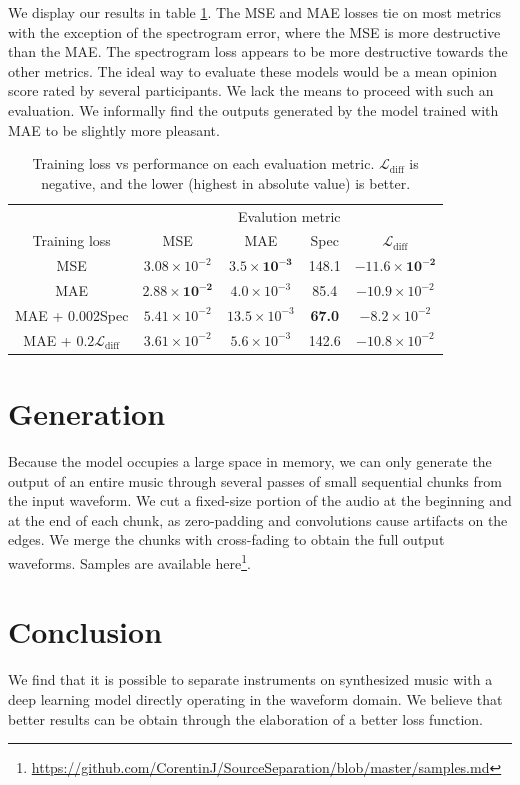 \documentclass[twocolumn,superscriptaddress,aps]{revtex4-1}
\begin{document}
We display our results in table \ref{results}. The MSE and MAE losses tie on most metrics with the exception of the spectrogram error, where the MSE is more destructive than the MAE. The spectrogram loss appears to be more destructive towards the other metrics. The ideal way to evaluate these models would be a mean opinion score rated by several participants. We lack the means to proceed with such an evaluation. We informally find the outputs generated by the model trained with MAE to be slightly more pleasant. 
 
\begin{table}[!h]
	\centering
	\small{%
	\begin{tabular}{c|c|c|c|c}
		&\multicolumn{4}{c}{Evalution metric} \\
		Training loss & MSE & MAE & Spec & $\mathcal{L}_{\text{diff}}$  \\ \hline
		MSE & $3.08\times10^{-2}$ & $\bm{3.5\times10^{-3}}$ & 148.1 & $\bm{-11.6\times10^{-2}}$\\ 
		MAE & $\bm{2.88\times10^{-2}}$ & $4.0\times10^{-3}$ & 85.4 & $-10.9\times10^{-2}$\\ 
		MAE + 0.002Spec & $5.41\times10^{-2}$ & $13.5\times10^{-3}$ & \textbf{67.0} & $-8.2\times10^{-2}$ \\ 
		MAE + $0.2\mathcal{L}_{\text{diff}}$ & $3.61\times10^{-2}$ & $5.6\times10^{-3}$ & 142.6 & $-10.8\times10^{-2}$ \\ 
	\end{tabular}}
	\caption{Training loss vs performance on each evaluation metric. $\mathcal{L}_{\text{diff}}$ is negative, and the lower (highest in absolute value) is better.}
	\label{results}
\end{table}	


\section{Generation}
Because the model occupies a large space in memory, we can only generate the output of an entire music through several passes of small sequential chunks from the input waveform. We cut a fixed-size portion of the audio at the beginning and at the end of each chunk, as zero-padding and convolutions cause artifacts on the edges. We merge the chunks with cross-fading to obtain the full output waveforms. Samples are available here\footnote{\url{https://github.com/CorentinJ/SourceSeparation/blob/master/samples.md}}.

\section{Conclusion}
We find that it is possible to separate instruments on synthesized music with a deep learning model directly operating in the waveform domain. We believe that better results can be obtain through the elaboration of a better loss function.




\end{document}
